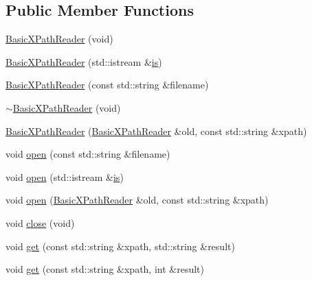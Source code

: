 \subsection*{Public Member Functions}
\begin{DoxyCompactItemize}
\item 
\mbox{\hyperlink{classXMLXPathReader_1_1BasicXPathReader_a940138f7f52261b6190f2f23b73c648f}{Basic\+X\+Path\+Reader}} (void)
\item 
\mbox{\hyperlink{classXMLXPathReader_1_1BasicXPathReader_ae50fd4b786cbc875ba1ca6e04a62815f}{Basic\+X\+Path\+Reader}} (std\+::istream \&\mbox{\hyperlink{x_8cc_a81abbbdef81e25584a2eab888e643d3d}{is}})
\item 
\mbox{\hyperlink{classXMLXPathReader_1_1BasicXPathReader_ad8df69bf440f9a9602fcba52782489f0}{Basic\+X\+Path\+Reader}} (const std\+::string \&filename)
\item 
\mbox{\hyperlink{classXMLXPathReader_1_1BasicXPathReader_ad741466e0f48892e36f19472db5abf52}{$\sim$\+Basic\+X\+Path\+Reader}} (void)
\item 
\mbox{\hyperlink{classXMLXPathReader_1_1BasicXPathReader_ae0a95bb52d6b3691662663070f77f47f}{Basic\+X\+Path\+Reader}} (\mbox{\hyperlink{classXMLXPathReader_1_1BasicXPathReader}{Basic\+X\+Path\+Reader}} \&old, const std\+::string \&xpath)
\item 
void \mbox{\hyperlink{classXMLXPathReader_1_1BasicXPathReader_a453ed92ad20f71b672f3b92e91e40b1c}{open}} (const std\+::string \&filename)
\item 
void \mbox{\hyperlink{classXMLXPathReader_1_1BasicXPathReader_ad8571b674b8deec118d9a53526631a06}{open}} (std\+::istream \&\mbox{\hyperlink{x_8cc_a81abbbdef81e25584a2eab888e643d3d}{is}})
\item 
void \mbox{\hyperlink{classXMLXPathReader_1_1BasicXPathReader_ad14294c5472659252f945c3664bd184a}{open}} (\mbox{\hyperlink{classXMLXPathReader_1_1BasicXPathReader}{Basic\+X\+Path\+Reader}} \&old, const std\+::string \&xpath)
\item 
void \mbox{\hyperlink{classXMLXPathReader_1_1BasicXPathReader_acd03bd5e585de0a5077544314cd8fb9a}{close}} (void)
\item 
void \mbox{\hyperlink{classXMLXPathReader_1_1BasicXPathReader_a167f3e878414daf1c5804ee1de3235e9}{get}} (const std\+::string \&xpath, std\+::string \&result)
\item 
void \mbox{\hyperlink{classXMLXPathReader_1_1BasicXPathReader_a15cacfab2a9a662f71d3b4d73cf423df}{get}} (const std\+::string \&xpath, int \&result)
\item 

\end{DoxyCompactItemize}

